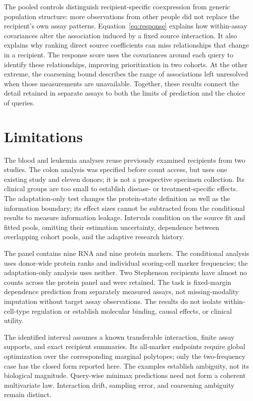 \documentclass[pdflatex,sn-vancouver-num,iicol]{sn-jnl}
\begin{document}
The pooled controls distinguish recipient-specific coexpression from generic
population structure: more observations from other people did not replace
the recipient's own assay patterns. Equation~\eqref{eq:response} explains how
within-assay covariances alter the association induced by a fixed source
interaction. It also explains why ranking direct source coefficients can miss
relationships that change in a recipient. The response score uses the
covariances around each query to identify these relationships, improving
prioritization in two cohorts. At the other extreme, the coarsening bound
describes the range of associations left unresolved when those measurements
are unavailable. Together, these results connect the detail retained in
separate assays to both the limits of prediction and the choice of queries.

\section{Limitations}
The blood and leukemia analyses reuse previously examined recipients from two
studies. The colon analysis was specified before count access, but uses one
existing study and eleven donors; it is not a prospective specimen collection.
Its clinical groups are too small to establish disease- or treatment-specific
effects. The adaptation-only test changes the
protein-state definition as well as the information boundary; its effect sizes
cannot be subtracted from the conditional results to measure information leakage.
Intervals condition on the source fit and fitted pools, omitting their
estimation uncertainty, dependence between overlapping cohort pools, and the
adaptive research history.

The panel contains nine RNA and nine protein markers. The conditional analysis
uses donor-wide protein ranks and individual scoring-cell marker frequencies;
the adaptation-only analysis uses neither. Two Stephenson recipients have almost no counts across
the protein panel and were retained. The task is fixed-margin dependence
prediction from separately measured assays, not missing-modality imputation
without target assay observations. The
results do not isolate within-cell-type regulation or establish molecular
binding, causal effects, or clinical utility.

The identified interval assumes a known transferable interaction, finite
assay supports, and exact recipient summaries. Its all-marker endpoints require
global optimization over the corresponding marginal polytopes; only the
two-frequency case has the closed form reported here. The examples establish
ambiguity, not its biological magnitude. Query-wise minimax predictions need
not form a coherent multivariate law. Interaction drift, sampling error, and
coarsening ambiguity remain distinct.
\end{document}

